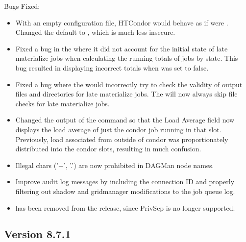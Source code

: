 \noindent Bugs Fixed:

\begin{itemize}

\item With an empty configuration file, HTCondor would behave as if
 were \Expr{*}.  Changed the default to
, which is much less insecure.

\item Fixed a bug in the  where it did not account for the initial state of
late materialize jobs when calculating the running totals of jobs by state. This bug
resulted in  displaying incorrect totals when 
was set to false.

\item Fixed a bug where the  would incorrectly try to check the
validity of output files and directories for late materialize jobs. The 
will now always skip file checks for late materialize jobs.

\item Changed the output of the  command so that the Load Average
field now displays the load average of just the condor job running in that
slot.  Previously, load associated from outside of condor was proportionately
distributed into the condor slots, resulting in much confusion.

\item Illegal chars ('+', '.') are now prohibited in DAGMan node names.

\item Improve audit log messages by including the connection ID and properly
filtering out shadow and gridmanager modifications to the job queue log.

\item {} has been removed from the release, since
PrivSep is no longer supported.

\end{itemize}

\subsection*{\label{sec:New-8-7-1}Version 8.7.1}

